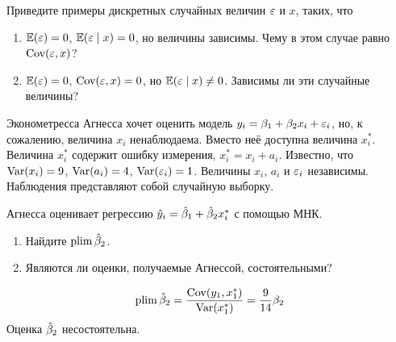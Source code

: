 \begin{problem}
Приведите примеры дискретных случайных величин $\varepsilon$ и $x$, таких, что
\begin{enumerate}
\item $\operatorname{\mathbb E}(\varepsilon)=0$, $\operatorname{\mathbb E}(\varepsilon\mid x)=0$, но величины зависимы. Чему в этом случае равно $\operatorname{Cov}(\varepsilon,x)$?
\item $\operatorname{\mathbb E}(\varepsilon)=0$, $\operatorname{Cov}(\varepsilon,x)=0$, но $\operatorname{\mathbb E}(\varepsilon\mid x)\neq 0$. Зависимы ли эти случайные величины?
\end{enumerate}


\begin{sol}
\end{sol}
\end{problem}


\begin{problem}
Эконометресса Агнесса хочет оценить модель $y_i=\beta_1+\beta_2 x_i +\varepsilon_i$, но, 
к сожалению, величина $x_i$ ненаблюдаема. Вместо неё доступна величина  $x_i^*$. 
Величина $x_i^*$  содержит ошибку измерения, $x_i^*=x_i+a_i$. 
Известно, что $\operatorname{Var}(x_i)=9$, $\operatorname{Var}(a_i)=4$,   $\operatorname{Var}(\varepsilon_i)=1$. 
Величины $x_i$, $a_i$ и $\varepsilon_i$ независимы.
Наблюдения представляют собой случайную выборку.

Агнесса оценивает регрессию $\hat{y}_i=\hat{\beta}_1+\hat{\beta}_2 x_i^*$ с помощью МНК.
\begin{enumerate}
\item Найдите $\operatorname*{plim} \hat{\beta}_2$.
\item Являются ли оценки, получаемые Агнессой, состоятельными?
\end{enumerate}


\begin{sol}
  \[
  \operatorname*{plim} \hat{\beta}_2 = \frac{\operatorname{Cov}(y_1, x_1^*)}{\operatorname{Var}(x_1^*)} = \frac{9}{14}\beta_2
  \]
  Оценка $\hat{\beta}_2$ несостоятельна.
\end{sol}
\end{problem}



